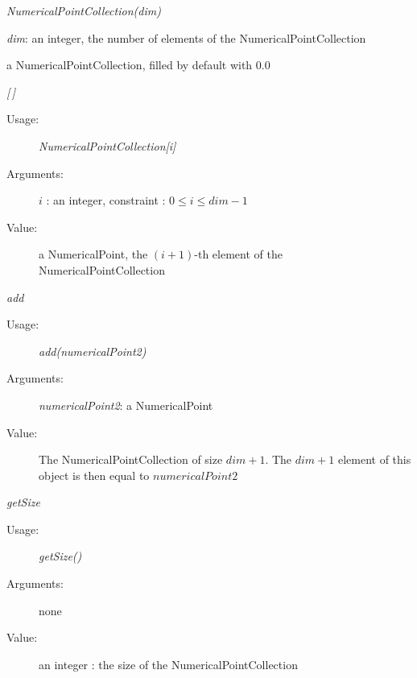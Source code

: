 \begin{description}

\item[Usage:] \rule{0pt}{1em}\textit{NumericalPointCollection(dim)}

\item[Arguments:]  \textit{dim}: an integer, the number of elements of the NumericalPointCollection

\item[Value:] a NumericalPointCollection, filled by default with 0.0

\item[Some methods :]  \rule{0pt}{1em}

\begin{description}

\item \textit{[\,]}
\begin{description}
\item[Usage:] \textit{NumericalPointCollection[i]}
\item[Arguments:] $i$ : an integer, constraint : $0\leq i \leq dim-1$
\item[Value:] a NumericalPoint, the $(i+1)$-th element of the NumericalPointCollection
\end{description}
\bigskip

\item \textit{add}
\begin{description}
\item[Usage:] \textit{add(numericalPoint2)}
\item[Arguments:] \textit{numericalPoint2}: a NumericalPoint
\item[Value:] The NumericalPointCollection of size $dim+1$.
The $dim+1$ element of this object is then equal to $numericalPoint2$
\end{description}
\bigskip

\item \textit{getSize}
\begin{description}
\item[Usage:] \textit{getSize()}
\item[Arguments:] none
\item[Value:] an integer : the size of the NumericalPointCollection
\end{description}
\bigskip


\end{description}
\end{description}




